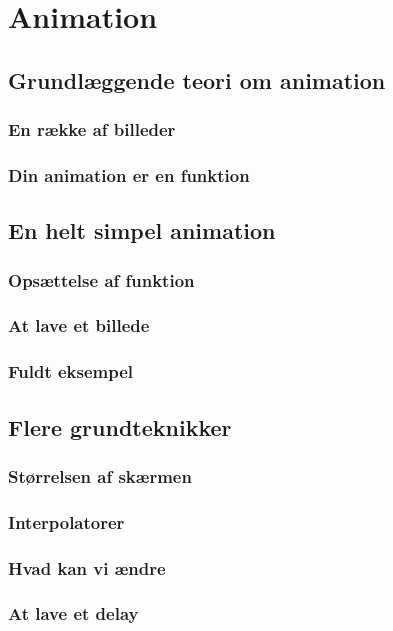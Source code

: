 
\chapter{Animation}

\section{Grundlæggende teori om animation}
\subsection{En række af billeder}
\subsection{Din animation er en funktion}
\section{En helt simpel animation}
\subsection{Opsættelse af funktion}
\subsection{At lave et billede}
\subsection{Fuldt eksempel}
\section{Flere grundteknikker}
\subsection{Størrelsen af skærmen}
\subsection{Interpolatorer}
\subsection{Hvad kan vi ændre}
\subsection{At lave et delay}
